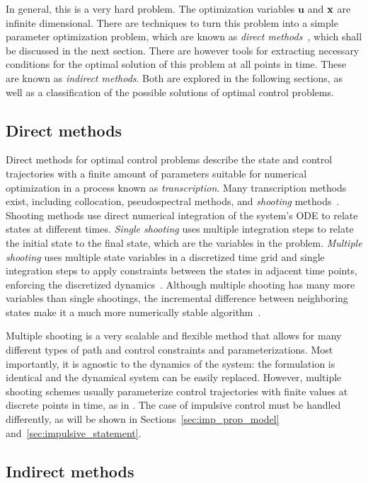 In general, this is a very hard problem. The optimization variables \(\mathbf{u}\) and \(\mathbf{x}\) are infinite dimensional. There are techniques to turn this problem into a simple parameter optimization problem, which are known as \textit{direct methods}~\cite{Conway_2010}, which shall be discussed in the next section. There are however tools for extracting necessary conditions for the optimal solution of this problem at all points in time. These are known as \textit{indirect methods}. Both are explored in the following sections, as well as a classification of the possible solutions of optimal control problems.

\subsection{Direct methods}

Direct methods for optimal control problems describe the state and control trajectories with a finite amount of parameters suitable for numerical optimization in a process known as \textit{transcription}. Many transcription methods exist, including collocation, pseudospectral methods, and \textit{shooting} methods~\cite{Conway_2010}. Shooting methods use direct numerical integration of the system's ODE to relate states at different times. \textit{Single shooting} uses multiple integration steps to relate the initial state to the final state, which are the variables in the problem. \textit{Multiple shooting} uses multiple state variables in a discretized time grid and single integration steps to apply constraints between the states in adjacent time points, enforcing the discretized dynamics~\cite{numerical_recipes}. Although multiple shooting has many more variables than single shootings, the incremental difference between neighboring states make it a much more numerically stable algorithm~\cite{ross2015primer}.

Multiple shooting is a very scalable and flexible method that allows for many different types of path and control constraints and parameterizations. Most importantly, it is agnostic to the dynamics of the system: the formulation is identical and the dynamical system can be easily replaced. However, multiple shooting schemes usually parameterize control trajectories with finite values at discrete points in time, as in . The case of impulsive control must be handled differently, as will be shown in Sections~\ref{sec:imp_prop_model} and~\ref{sec:impulsive_statement}.

\subsection{Indirect methods}

